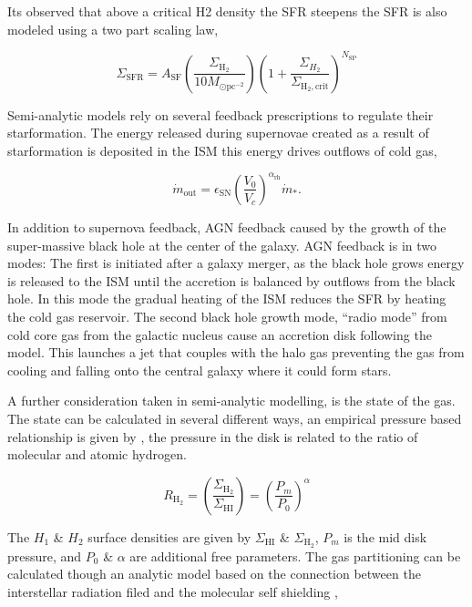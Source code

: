 Its observed that above a critical H2 density the SFR steepens \citep{Narayanan2012ALaw} the SFR is also modeled using a two part scaling law,

\begin{equation}
    \Sigma_{\mathrm{SFR}}=A_{\mathrm{SF}}\left(\frac{\Sigma_{\mathrm{H}_{2}}}{10 M_{\odot \mathrm{pc}^{-2}}}\right)\left(1+\frac{\Sigma_{H_{2}}}{\Sigma_{\mathrm{H}_{2}, \mathrm{crit}}}\right)^{N_{\mathrm{SP}}}
\end{equation}

Semi-analytic models rely on several feedback prescriptions to regulate their starformation. The energy released during supernovae created as a result of starformation is deposited in the ISM this energy drives outflows of cold gas,

\begin{equation}
    \dot{m}_{\mathrm{out}}=\epsilon_{\mathrm{SN}}\left(\frac{V_{0}}{V_{c}}\right)^{\alpha_{\mathrm{rh}}} \dot{m}_{*}.
\end{equation}

In addition to supernova feedback, AGN feedback caused by the growth of the super-massive black hole at the center of the galaxy. AGN feedback is in two modes: The first is initiated after a galaxy merger, as the black hole grows energy is released to the ISM until the accretion is balanced by outflows from the black hole. In this mode the gradual heating of the ISM reduces the SFR by heating the cold gas reservoir. The second black hole growth mode, ``radio mode'' from cold core gas from the galactic nucleus cause an accretion disk following the \citet{Bondi1952OnAccretion} model. This launches a jet that couples with the halo gas preventing the gas from cooling and falling onto the central galaxy where it could form stars.

A further consideration taken in semi-analytic modelling, is the state of the gas. The state can be calculated in several different ways, an empirical pressure based relationship is given by \citet{Blitz2006TheRelation}, the pressure in the disk is related to the ratio of molecular and atomic hydrogen. 

\begin{equation}
    R_{\mathrm{H}_{2}}=\left(\frac{\Sigma_{\mathrm{H}_{2}}}{\Sigma_{\mathrm{HI}}}\right)=\left(\frac{P_{m}}{P_{0}}\right)^{\alpha}
\end{equation}

The $H_1$ \& $H_2$ surface densities are given by $\Sigma_{\mathrm{HI}}$ \& $\Sigma_{\mathrm{H}_{2}}$, $P_m$ is the mid disk pressure, and $P_0$ \& $\alpha$ are additional free parameters. The gas partitioning can be calculated though an analytic model based on the connection between the interstellar radiation filed and the molecular self shielding \citep{Krumholz2008TheClouds,Krumholz2009THEDENSITIES,Krumholz2009THEGAS},


